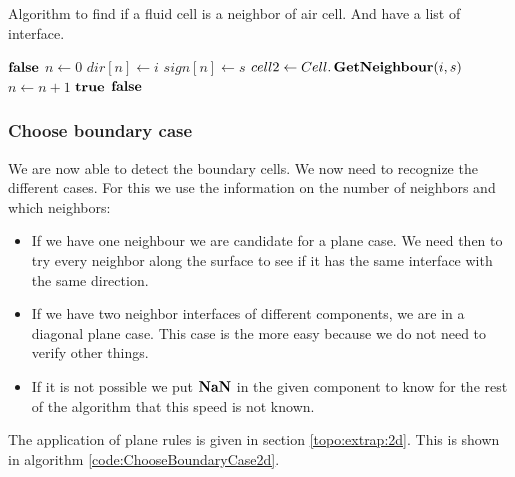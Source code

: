 \begin{algorithm}
\caption{Algorithm to find if a fluid cell is a neighbor of air cell. And have a list of interface.}\label{code:IsBoundary}
\begin{algorithmic}[1]
\State   \Return $\mathop{\textbf{false}}$ 
\EndIf
\State $n\gets 0$
 
 
\State $dir[n]\gets i$ 
\State $sign[n]\gets s$ 
		\State $cell2 \gets Cell.\mathop{\textbf{GetNeighbour}}(i,s)$
			\State $n\gets n+1$ 
		\EndIf
		\EndIf
\EndFor
\EndFor
{}
\State \Return $\mathop{\textbf{true}}$ 
\EndIf
\State \Return $\mathop{\textbf{false}}$ 
\EndFunction
\end{algorithmic}
\end{algorithm}


\subsubsection{Choose boundary case}
We are now able to detect the boundary cells. We now need to recognize the different cases.
For this we use the information on the number of neighbors and which neighbors:
\begin{itemize}
\item If we have one neighbour we are candidate for a plane case. We need then to try every neighbor along the surface to
see if it has the same interface with the same direction.
\item  If we have two neighbor interfaces of different components, we are in a diagonal plane case.
This case is the more easy because we do not need to verify other things.
\item If it is not possible we put $\mathop{\textbf{NaN}}$ in the given component to know for the rest of the algorithm that this speed is not known.
\end{itemize}
The application of plane rules is given in section \ref{topo:extrap:2d}.
This is shown in algorithm \ref{code:ChooseBoundaryCase2d}.

